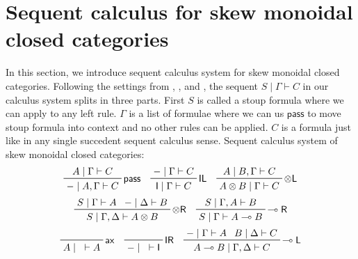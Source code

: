 \documentclass{article}
\newcommand{\pass}{\mathsf{pass}}
\begin{document}
\section{Sequent calculus for skew monoidal closed categories}
In this section, we introduce sequent calculus system for skew monoidal closed categories.
Following the settings from \cite{uustalu_sequent_2018}, \cite{uustalu_deductive_nodate}, and \cite{uustalu_proof_nodate}, the sequent $S \mid \Gamma \vdash C$ in our calculus system splits in three parts.
First $S$ is called a stoup formula where we can apply to any left rule.
$\Gamma$ is a list of formulae where we can us $\pass$ to move stoup formula into context and no other rules can be applied.
$C$ is a formula just like in any single succedent sequent calculus sense.
Sequent calculus system of skew monoidal closed categories:
\begin{displaymath}
  \prftree[r]{$\mathsf{pass}$}
  {
  A\mid \Gamma \vdash C
  }
  {
  -\mid A, \Gamma \vdash C
  }
  \quad
  \prftree[r]{$\mathsf{IL}$}
  {
  -\mid \Gamma \vdash C
  }
  {
  \mathsf{I} \mid \Gamma \vdash C
  }
  \quad
  \prftree[r]{$\otimes \mathsf{L}$}
  {
  A\mid B, \Gamma \vdash C
  }
  {
  A\otimes B\mid \Gamma \vdash C
  }
\end{displaymath}
\begin{displaymath}
  \prftree[r]{$\otimes \mathsf{R}$}
  {
  S\mid \Gamma \vdash A
  }
  {
  -\mid \Delta \vdash B
  }
  {
  S\mid \Gamma , \Delta \vdash A\otimes B
  }
  \quad
  \prftree[r]{$\multimap \mathsf{R}$}
  {
  S\mid \Gamma ,A \vdash B
  }
  {
  S\mid \Gamma \vdash A\multimap B
  }
\end{displaymath}
\begin{displaymath}
  \prftree[r]{$\mathsf{ax}$}
  {
  A\mid \text{ } \vdash A
  }
  \quad
  \prftree[r]{$\mathsf{IR}$}
  {}
  {
  -\mid \text{ } \vdash \mathsf{I}
  }
  \quad
  \prftree[r]{$\multimap \mathsf{L}$}
  {
  -\mid \Gamma \vdash A
  }
  {
  B\mid \Delta \vdash C
  }
  {
  A\multimap B \mid \Gamma , \Delta \vdash C
  }
\end{displaymath}
\end{document}
